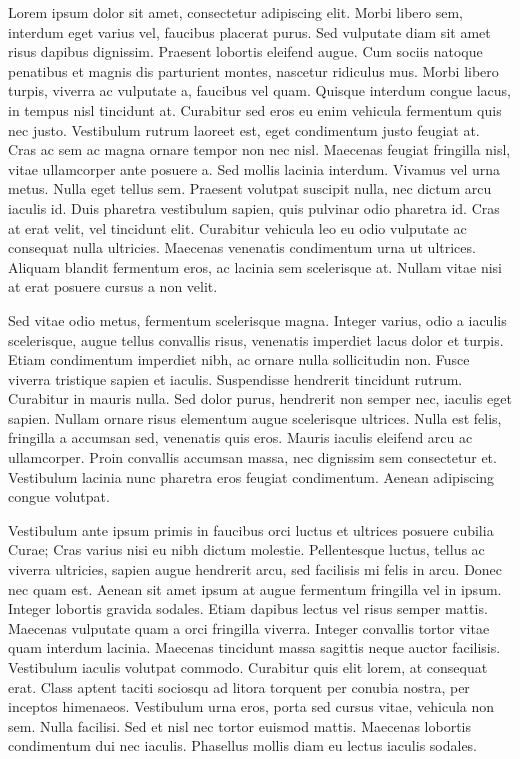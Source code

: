 Lorem ipsum dolor sit amet, consectetur adipiscing elit. Morbi libero sem,
interdum eget varius vel, faucibus placerat purus. Sed vulputate diam sit amet
risus dapibus dignissim. Praesent lobortis eleifend augue. Cum sociis natoque
penatibus et magnis dis parturient montes, nascetur ridiculus mus. Morbi libero
turpis, viverra ac vulputate a, faucibus vel quam. Quisque interdum congue
lacus, in tempus nisl tincidunt at. Curabitur sed eros eu enim vehicula
fermentum quis nec justo. Vestibulum rutrum laoreet est, eget condimentum justo
feugiat at. Cras ac sem ac magna ornare tempor non nec nisl. Maecenas feugiat
fringilla nisl, vitae ullamcorper ante posuere a. Sed mollis lacinia interdum.
Vivamus vel urna metus. Nulla eget tellus sem. Praesent volutpat suscipit nulla,
nec dictum arcu iaculis id. Duis pharetra vestibulum sapien, quis pulvinar odio
pharetra id. Cras at erat velit, vel tincidunt elit. Curabitur vehicula leo eu
odio vulputate ac consequat nulla ultricies. Maecenas venenatis condimentum
urna ut ultrices. Aliquam blandit fermentum eros, ac lacinia sem scelerisque
at. Nullam vitae nisi at erat posuere cursus a non velit.


Sed vitae odio metus, fermentum scelerisque magna. Integer varius, odio a
iaculis scelerisque, augue tellus convallis risus, venenatis imperdiet lacus
dolor et turpis. Etiam condimentum imperdiet nibh, ac ornare nulla sollicitudin
non. Fusce viverra tristique sapien et iaculis. Suspendisse hendrerit tincidunt
rutrum. Curabitur in mauris nulla. Sed dolor purus, hendrerit non semper nec,
iaculis eget sapien. Nullam ornare risus elementum augue scelerisque ultrices.
Nulla est felis, fringilla a accumsan sed, venenatis quis eros. Mauris iaculis
eleifend arcu ac ullamcorper. Proin convallis accumsan massa, nec dignissim sem
consectetur et. Vestibulum lacinia nunc pharetra eros feugiat condimentum.
Aenean adipiscing congue volutpat.


Vestibulum ante ipsum primis in faucibus orci luctus et ultrices posuere cubilia
Curae; Cras varius nisi eu nibh dictum molestie. Pellentesque luctus, tellus ac
viverra ultricies, sapien augue hendrerit arcu, sed facilisis mi felis in arcu.
Donec nec quam est. Aenean sit amet ipsum at augue fermentum fringilla vel in
ipsum. Integer lobortis gravida sodales. Etiam dapibus lectus vel risus semper
mattis. Maecenas vulputate quam a orci fringilla viverra. Integer convallis
tortor vitae quam interdum lacinia. Maecenas tincidunt massa sagittis neque
auctor facilisis. Vestibulum iaculis volutpat commodo. Curabitur quis elit lorem,
at consequat erat. Class aptent taciti sociosqu ad litora torquent per conubia
nostra, per inceptos himenaeos. Vestibulum urna eros, porta sed cursus vitae,
vehicula non sem. Nulla facilisi. Sed et nisl nec tortor euismod mattis.
Maecenas lobortis condimentum dui nec iaculis. Phasellus mollis diam eu lectus
iaculis sodales.


